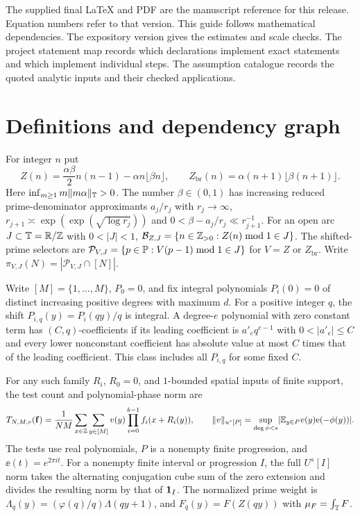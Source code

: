 \noindent The supplied final LaTeX and PDF are the manuscript reference
for this release. Equation numbers refer to that version.
This guide follows mathematical dependencies. The expository version gives
the estimates and scale checks. The project statement map records which
declarations implement exact statements and which implement individual steps.
The assumption catalogue records the quoted analytic inputs and their
checked applications.

\section{Definitions and dependency graph}

\begin{definition}\label{selector}
For integer $n$ put
\[
 Z(n)=\frac{\alpha\beta}{2}n(n-1)-\alpha n\lfloor\beta n\rfloor,
 \qquad Z_{\mathrm{br}}(n)=\alpha(n+1)\lfloor\beta(n+1)\rfloor.
\]
Here $\inf_{m\ge1}m\lVert m\alpha\rVert_{\mathbb T}>0$. The number $\beta\in(0,1)$
has increasing reduced prime-denominator approximants $a_j/r_j$
with $r_j\to\infty$,
$r_{j+1}\asymp\exp(\exp(\sqrt{\log r_j}))$ and
$0<\beta-a_j/r_j\ll r_{j+1}^{-1}$.
For an open arc $J\subset\mathbb T=\mathbb R/\mathbb Z$ with $0<|J|<1$,
$\mathcal B_{Z,J}=\{n\in\mathbb Z_{>0}:Z(n)\bmod 1\in J\}$.
The shifted-prime selectors are
$\mathcal P_{V,J}=\{p\in\mathbb P:V(p-1)\bmod 1\in J\}$ for
$V=Z$ or $Z_{\mathrm{br}}$. Write
$\pi_{V,J}(N)=|\mathcal P_{V,J}\cap[N]|$.
\end{definition}

\begin{definition}\label{d:Cq}
Write $[M]=\{1,\ldots,M\}$, $P_0=0$, and fix integral polynomials
$P_i(0)=0$ of distinct increasing positive degrees with maximum $d$.
For a positive integer $q$, the shift $P_{i,q}(y)=P_i(qy)/q$ is integral.
A degree-$e$ polynomial with zero constant term has $(C,q)$-coefficients
if its leading coefficient is $a'_e q^{e-1}$ with $0<|a'_e|\le C$
and every lower nonconstant coefficient has absolute value at most $C$
times that of the leading coefficient. This class includes all $P_{i,q}$
for some fixed $C$.

For any such family $R_i$, $R_0=0$, and $1$-bounded spatial inputs
of finite support, the test count and polynomial-phase norm are
\[
 T_{N,M,v}(\mathbf f)
   =\frac{1}{NM}\sum_{x\in\mathbb Z}\sum_{y\in[M]}
        v(y)\prod_{i=0}^{k-1}f_i(x+R_i(y)),\qquad
 \lVert v\rVert_{u^s[P]}
   =\sup_{\deg\phi<s}\lvert\mathbb E_{y\in P}v(y)\mathrm e(-\phi(y))\rvert.
\]
The tests use real polynomials, $P$ is a nonempty finite progression,
and $\ee(t)=e^{2\pi it}$. For a nonempty finite interval or progression
$I$, the full $U^s[I]$ norm takes the alternating
conjugation cube sum of the zero extension and divides the resulting
norm by that of $\mathbf 1_I$. The normalized prime weight is
$\Lambda_q(y)=(\varphi(q)/q)\Lambda(qy+1)$, and
$F_q(y)=F(Z(qy))$ with $\mu_F=\int_\mathbb T F$.
\end{definition}

